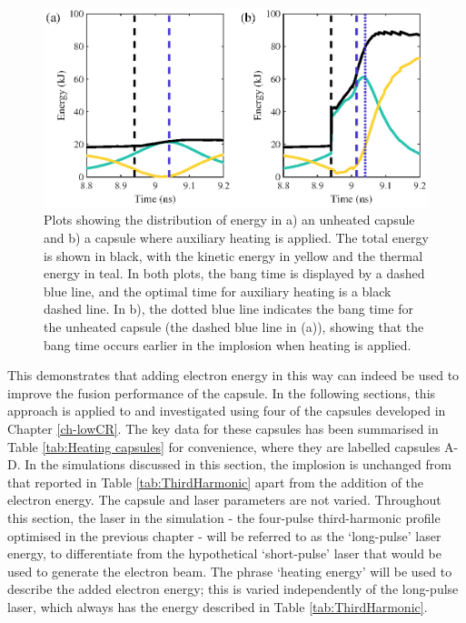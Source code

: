 \begin{figure}[ht]
\centering
\includegraphics{figures/FurtherSims/EnergyDist.eps}
\caption{Plots showing the distribution of energy in a) an unheated capsule and b) a capsule where auxiliary heating is applied. The total energy is shown in black, with the kinetic energy in yellow and the thermal energy in teal. In both plots, the bang time is displayed by a dashed blue line, and the optimal time for auxiliary heating is a black dashed line. In b), the dotted blue line indicates the bang time for the unheated capsule (the dashed blue line in (a)), showing that the bang time occurs earlier in the implosion when heating is applied.}
\label{fig:EnergyDist}
\end{figure}

This demonstrates that adding electron energy in this way can indeed be used to improve the fusion performance of the capsule. In the following sections, this approach is applied to and investigated using four of the capsules developed in Chapter \ref{ch-lowCR}. The key data for these capsules has been summarised in Table  \ref{tab:Heating capsules} for convenience, where they are labelled capsules A-D. In the simulations discussed in this section, the implosion is unchanged from that reported in Table \ref{tab:ThirdHarmonic} apart from the addition of the electron energy. The capsule and laser parameters are not varied. Throughout this section, the laser in the simulation - the four-pulse third-harmonic profile optimised in the previous chapter - will be referred to as the `long-pulse' laser energy, to differentiate from the hypothetical `short-pulse' laser that would be used to generate the electron beam. The phrase `heating energy' will be used to describe the added electron energy; this is varied independently of the long-pulse laser, which always has the energy described in Table \ref{tab:ThirdHarmonic}.

